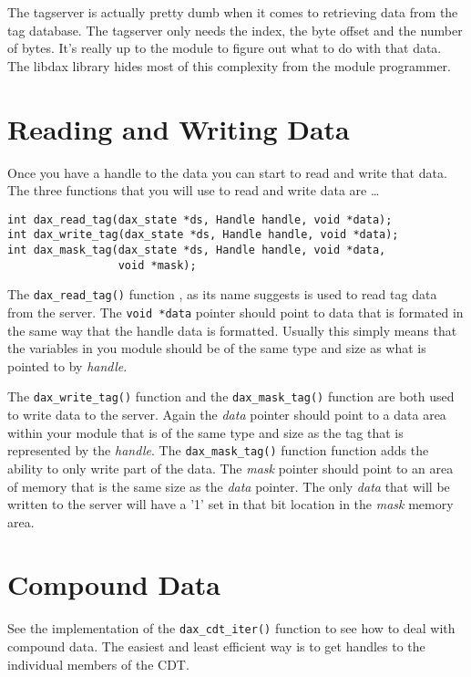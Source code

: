 The tagserver is actually pretty dumb when it comes to retrieving data from the tag database.  The
tagserver only needs the index, the byte offset and the number of bytes.  It's really up to the 
module to figure out what to do with that data.  The libdax library hides most of this complexity
from the module programmer.

\section{Reading and Writing Data}

Once you have a handle to the data you can start to read and write that data.  The three functions that you will use to read and write data are \ldots

\begin{verbatim}
int dax_read_tag(dax_state *ds, Handle handle, void *data);
int dax_write_tag(dax_state *ds, Handle handle, void *data);
int dax_mask_tag(dax_state *ds, Handle handle, void *data,
                 void *mask);
\end{verbatim}

The \verb|dax_read_tag()| function , as its name suggests is used to read tag data from the server.  The \verb|void *data| pointer should point to data that is formated in the same way that the handle data is formatted.  Usually this simply means that the variables in you module should be of the same type and size as what is pointed to by \emph{handle}.

The \verb|dax_write_tag()| function  and the \verb|dax_mask_tag()| function  are both used to write data to the server.  Again the \emph{data} pointer should point to a data area within your module that is of the same type and size as the tag that is represented by the \emph{handle}.  The \verb|dax_mask_tag()| function function adds the ability to only write part of the data.  The \emph{mask} pointer should point to an area of memory that is the same size as the \emph{data} pointer.  The only \emph{data} that will be written to the server will have a '1' set in that bit location in the \emph{mask} memory area.

\section{Compound Data}

See the implementation of the \verb|dax_cdt_iter()| function  to see how to deal with compound data.  The easiest and least efficient way is to get handles to the individual members of the CDT.

